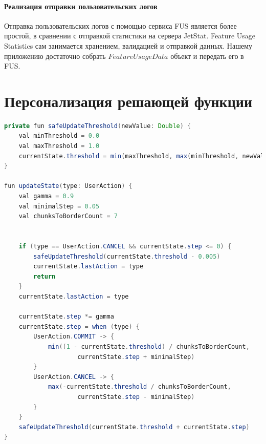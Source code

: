 \documentclass[times]{itmo-student-thesis}
\begin{document}
\subsubsection{Реализация отправки пользовательских логов}
Отправка пользовательских логов с помощью сервиса FUS является более простой, в сравнении с отправкой статистики на сервера JetStat. Feature Usage Statistics сам занимается хранением, валидацией и отправкой данных. Нашему приложению достаточно собрать $FeatureUsageData$ объект и передать его в FUS.
\printmainbibliography

\appendix

\chapter{Персонализация решающей функции}
\begin{lstlisting}[caption={Персонализация решающей функции},label={personalization}, language=Java, tabsize=2, basicstyle=\fontsize{10}{10}\selectfont\ttfamily]
private fun safeUpdateThreshold(newValue: Double) {
    val minThreshold = 0.0
    val maxThreshold = 1.0
    currentState.threshold = min(maxThreshold, max(minThreshold, newValue))
}

fun updateState(type: UserAction) {
    val gamma = 0.9
    val minimalStep = 0.05
    val chunksToBorderCount = 7


    if (type == UserAction.CANCEL && currentState.step <= 0) {
        safeUpdateThreshold(currentState.threshold - 0.005)
        currentState.lastAction = type
        return
    }
    currentState.lastAction = type

    currentState.step *= gamma
    currentState.step = when (type) {
        UserAction.COMMIT -> {
            min((1 - currentState.threshold) / chunksToBorderCount,
                    currentState.step + minimalStep)
        }
        UserAction.CANCEL -> {
            max(-currentState.threshold / chunksToBorderCount,
                    currentState.step - minimalStep)
        }
    }
    safeUpdateThreshold(currentState.threshold + currentState.step)
}
\end{lstlisting}
\end{document}
